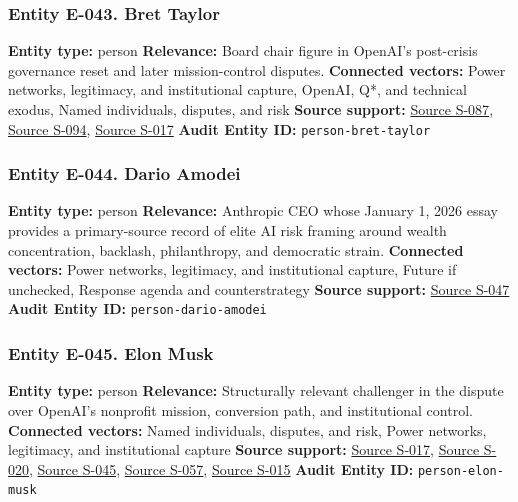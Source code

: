 \documentclass[
  american,
  11pt,
  letterpaper,
]{article}
\begin{document}
\subsubsection{Entity E-043. Bret
Taylor}\label{entity-e-043-bret-taylor}

\textbf{Entity type:} person \textbf{Relevance:} Board chair figure in
OpenAI's post-crisis governance reset and later mission-control
disputes. \textbf{Connected vectors:} Power networks, legitimacy, and
institutional capture, OpenAI, Q*, and technical exodus, Named
individuals, disputes, and risk \textbf{Source support:}
\hyperref[source-s-087-sam-altman-returns-as-ceo-openai-has-a-new-initial-board]{Source
S-087},
\hyperref[source-s-094-openai-announces-new-members-to-board-of-directors]{Source
S-094},
\hyperref[source-s-017-openai-board-unanimously-rejects-elon-musk-s-97-4-billion-proposal]{Source
S-017} \textbf{Audit Entity ID:} \texttt{person-bret-taylor}

\subsubsection{Entity E-044. Dario
Amodei}\label{entity-e-044-dario-amodei}

\textbf{Entity type:} person \textbf{Relevance:} Anthropic CEO whose
January 1, 2026 essay provides a primary-source record of elite AI risk
framing around wealth concentration, backlash, philanthropy, and
democratic strain. \textbf{Connected vectors:} Power networks,
legitimacy, and institutional capture, Future if unchecked, Response
agenda and counterstrategy \textbf{Source support:}
\hyperref[source-s-047-the-adolescence-of-technology]{Source S-047}
\textbf{Audit Entity ID:} \texttt{person-dario-amodei}

\subsubsection{Entity E-045. Elon Musk}\label{entity-e-045-elon-musk}

\textbf{Entity type:} person \textbf{Relevance:} Structurally relevant
challenger in the dispute over OpenAI's nonprofit mission, conversion
path, and institutional control. \textbf{Connected vectors:} Named
individuals, disputes, and risk, Power networks, legitimacy, and
institutional capture \textbf{Source support:}
\hyperref[source-s-017-openai-board-unanimously-rejects-elon-musk-s-97-4-billion-proposal]{Source
S-017},
\hyperref[source-s-020-openai-says-musk-agreed-the-chatgpt-maker-should-become-a-for-profit-company]{Source
S-020}, \hyperref[source-s-045-musk-v-altman-4-24-cv-04722]{Source
S-045},
\hyperref[source-s-057-judge-denies-elon-musks-attempt-to-immediately-block-openais-conversion-to-for-profit-entity]{Source
S-057},
\hyperref[source-s-015-judge-denies-elon-musk-s-request-to-block-openai-for-profit-conversion-but-welcomes-trial]{Source
S-015} \textbf{Audit Entity ID:} \texttt{person-elon-musk}
\end{document}
